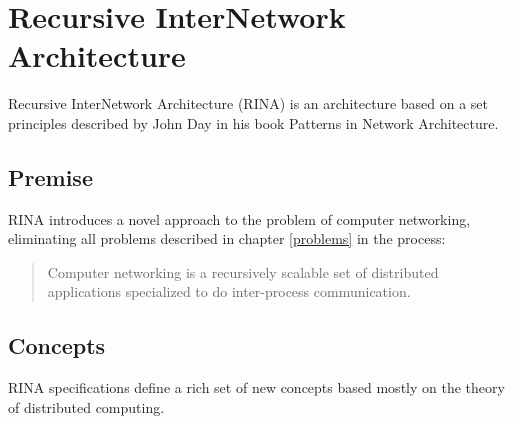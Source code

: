 





    \section{Recursive InterNetwork Architecture}\label{archs:rina}

        Recursive InterNetwork Architecture (RINA) is an architecture based on a set principles described by John Day in his book Patterns in Network Architecture. \cite{Patterns}

        \subsection{Premise}

            RINA introduces a novel approach to the problem of computer networking, eliminating all problems described in chapter \ref{problems} in the process:

            \begin{quotation}
                \centering
                Computer networking is a recursively scalable set of distributed applications specialized to do inter-process communication.
            \end{quotation}

        \subsection{Concepts}

            RINA specifications define a rich set of new concepts based mostly on the theory of distributed computing.

